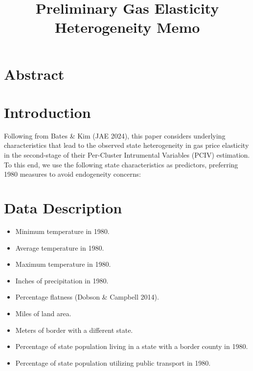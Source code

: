 \documentclass[12pt,a4paper]{article}
\begin{document}
\title{Preliminary Gas Elasticity Heterogeneity Memo}
\maketitle



\section{Abstract}



\section{Introduction}
Following from Bates \& Kim (JAE 2024), this paper considers underlying characteristics that lead to the observed state heterogeneity in gas price elasticity in the second-stage of their Per-Cluster Intrumental Variables (PCIV) estimation. \\

To this end, we use the following state characteristics as predictors, preferring 1980 measures to avoid endogeneity concerns: \\



\section{Data Description}
\begin{itemize}
	\item Minimum temperature in 1980. 
	\item Average temperature in 1980. 
	\item Maximum temperature in 1980. 
	\item Inches of precipitation in 1980. 
	\item Percentage flatness (Dobson \& Campbell 2014). 
	\item Miles of land area. 
	\item Meters of border with a different state. 
	\item Percentage of state population living in a state with a border county in 1980. 
	\item Percentage of state population utilizing public transport in 1980. 
\end{itemize}

\begin{center}
	
\end{center}
\end{document}
